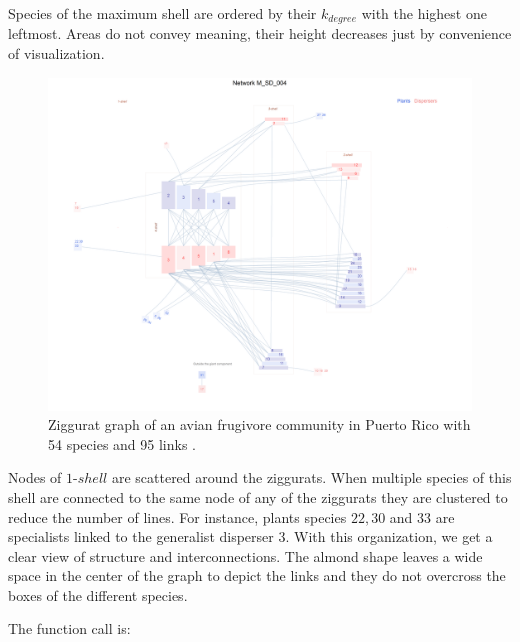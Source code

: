 \documentclass[11pt]{article}
\begin{document}
Species of the maximum shell are ordered by their $k_{degree}$ with the highest one leftmost. Areas do not convey meaning, their height decreases just by convenience of visualization. 

\begin{figure}[hp!]
\centering
\includegraphics[scale=0.4]{M_SD_004_ziggurat.png}
\caption {Ziggurat graph of an avian frugivore community in Puerto Rico with 54 species and 95 links \cite{carlo2003avian}.}
\label{fig:KMAN_ziggurat}
\end{figure}

Nodes of $1$-$shell$ are scattered around the ziggurats. When multiple species of this shell are connected to the same node of any of the ziggurats they are clustered to reduce the number of lines. For instance, plants species $22, 30$ and $33$ are specialists linked to the generalist disperser $3$. With this organization, we get a clear view of structure and interconnections. The almond shape leaves a wide space in the center of the graph to depict the links and they do not overcross the boxes of the different species.

\noindent The function call is:
\end{document}
